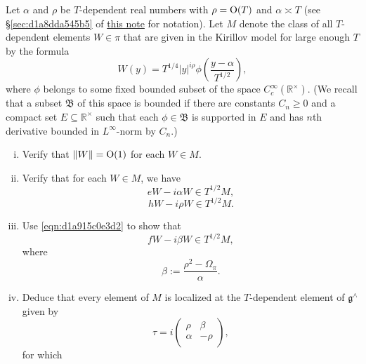 \documentclass[reqno]{amsart} 
\numberwithin{equation}{section}
\begin{document}
\begin{exercise}
  Let $\alpha$ and $\rho$ be $T$-dependent real numbers with $\rho = \operatorname{O}(T)$ and $\alpha \asymp T$ (see \S\ref{sec:d1a8dda545b5} of \href{20230522T150333__microlocal-localized-vectors.pdf}{this note} for notation).  Let $M$ denote the class of all $T$-dependent elements $W \in \pi$ that are given in the Kirillov model for large enough $T$ by the formula
  \begin{equation}\label{eqn:d1aa012dc1aa}
    W(y) =
    T^{1/4}
    \lvert y \rvert^{i \rho }
    \phi \left( \frac{y - \alpha}{T^{1/2} } \right),
  \end{equation}
  where $\phi$ belongs to some fixed bounded subset of the space $C_c^\infty(\mathbb{R}^\times)$.  (We recall that a subset $\mathfrak{B}$ of this space is bounded if there are constants $C_n \geq 0$ and a compact set $E \subseteq \mathbb{R}^\times$ such that each $\phi \in \mathfrak{B}$ is supported in $E$ and has $n$th derivative bounded in $L^\infty$-norm by $C_n$.)
  \begin{enumerate}[(i)]
  \item Verify that $\lVert W \rVert = \operatorname{O}(1)$ for each $W \in M$.
  \item Verify that for each $W \in M$, we have
    \begin{equation*}
      e W - i \alpha  W \in T^{1/2} M,
    \end{equation*}
    \begin{equation*}
      h W
      - i \rho W
      \in T^{1/2} M.
    \end{equation*}
  \item Use \eqref{eqn:d1a915c0e3d2} to show that
    \begin{equation*}
      f W - i \beta W \in T^{1/2} M,
    \end{equation*}
    where
    \begin{equation*}
      \beta := \frac{\rho^2 - \Omega_\pi}{\alpha}.
    \end{equation*}    
  \item Deduce that every element of $M$ is localized at the $T$-dependent element of $\mathfrak{g}^\wedge$ given by
    \begin{equation*}
      \tau = i 
      \begin{pmatrix}
        \rho  & \beta \\
        \alpha & -\rho \\
      \end{pmatrix},
    \end{equation*}
    for which
    \begin{equation*}

\end{equation*}
\end{enumerate}
\end{exercise}
\end{document}
